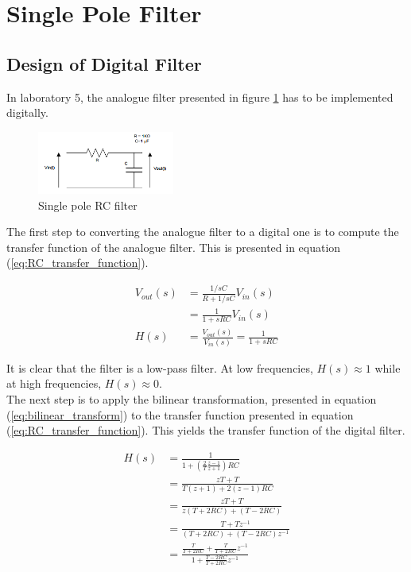 \documentclass{article}
\begin{document}
\section{Single Pole Filter}
\subsection{Design of Digital Filter}\label{sec:design_of_digital_filter}
In laboratory 5, the analogue filter presented in figure \ref{fig:RC_filter} has to be implemented digitally.

\begin{figure}[H]
    \centering
    \includegraphics[width = 0.4\textwidth]{RC_filter}
    \caption{Single pole RC filter}
    \label{fig:RC_filter}
\end{figure}

The first step to converting the analogue filter to a digital one is to compute the transfer function of the analogue filter. This is presented in equation (\ref{eq:RC_transfer_function}). 

\begin{align}
    V_{out}(s)  &= \frac{1/sC}{R + 1/sC}V_{in}(s) \nonumber \\
                &= \frac{1}{1 + sRC}V_{in}(s) \nonumber \\
    H(s) &= \frac{V_{out}(s)}{V_{in}(s)} = \frac{1}{1 + sRC}\label{eq:RC_transfer_function}
\end{align}

It is clear that the filter is a low-pass filter. At low frequencies, $H(s) \approx 1$ while at high frequencies, $H(s) \approx 0$.\\

The next step is to apply the bilinear transformation, presented in equation (\ref{eq:bilinear_transform}) to the transfer function presented in equation (\ref{eq:RC_transfer_function}). This yields the transfer function of the digital filter. 

\begin{align}
    H(s)    &= \frac{1}{1 + (\frac{2}{T}\frac{z-1}{z+1})RC} \nonumber \\
            &= \frac{zT+T}{T(z+1) + 2(z-1)RC} \nonumber \\
            &= \frac{zT+T}{z(T+2RC) + (T-2RC)} \nonumber \\
            &= \frac{T+Tz^{-1}}{(T+2RC) + (T-2RC)z^{-1}} \\
            &= \frac{\frac{T}{T+2RC}+\frac{T}{T+2RC}z^{-1}}{1 + \frac{T-2RC}{T+2RC}z^{-1}}\label{eq:digital_RC_tf}
\end{align}
\end{document}
